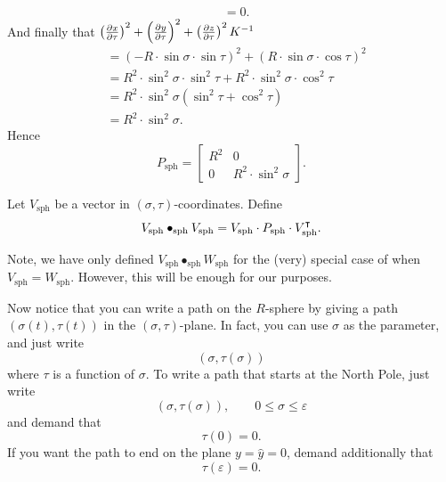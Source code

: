 \documentclass{ximera}
\begin{document}
\begin{problem}
\begin{freeResponse}
\begin{align*}
      &= 0.
    \end{align*}
    And finally that $\left(\pp[x]{\tau}\right)^2 + \left(\pp[y]{\tau}\right)^2 + \left(\pp[z]{\tau}\right)^2K^{-1}$
     \begin{align*}
       &= \left(-R\cdot \sin\sigma\cdot \sin \tau \right)^2 + \left( R\cdot \sin\sigma\cdot \cos\tau \right)^2 \\
       &= R^2\cdot \sin^2\sigma\cdot \sin^2 \tau + R^2\cdot \sin^2\sigma\cdot \cos^2\tau \\
       &= R^2\cdot \sin^2\sigma\left(\sin^2 \tau + \cos^2\tau\right) \\
       &= R^2\cdot \sin^2\sigma.
     \end{align*}
     Hence
     \[
     P_\mathrm{sph} =
  \begin{bmatrix}
    R^2 & 0 \\
    0 & R^2\cdot\sin^2 \sigma
  \end{bmatrix}.
     \]
  \end{freeResponse}
\end{problem}

\begin{definition}
  Let $V_\mathrm{sph}$ be a vector in
  $(\sigma,\tau)$-coordinates. Define
  \[
  V_\mathrm{sph} \bullet_\mathrm{sph} V_\mathrm{sph} = V_\mathrm{sph} \cdot P_\mathrm{sph} \cdot V_\mathrm{sph}^\transpose.
  \]
\end{definition}

\begin{warning}
  Note, we have only defined $V_\mathrm{sph}\bullet_\mathrm{sph}
  W_\mathrm{sph}$ for the (very) special case of when $V_\mathrm{sph}
  = W_\mathrm{sph}$. However, this will be enough for our purposes.
\end{warning}


Now notice that you can write a path on the $R$-sphere by giving a path
$\left( \sigma(t),\tau(t)\right)$ in the $(\sigma,\tau)$-plane. In
fact, you can use $\sigma$ as the parameter, and just write
\[
\left(\sigma,\tau(\sigma)\right)
\]
where $\tau$ is a function of $\sigma$. To write a path that starts at
the North Pole, just write%
\[
\left(\sigma,\tau(\sigma)\right), \qquad 0\leq\sigma\leq\varepsilon
\]
and demand that
\[
\tau(0) =0.
\]
If you want the path to end on the plane $y=\hat{y}=0$, demand
additionally that
\[
\tau(\varepsilon) =0.
\]

\end{document}
